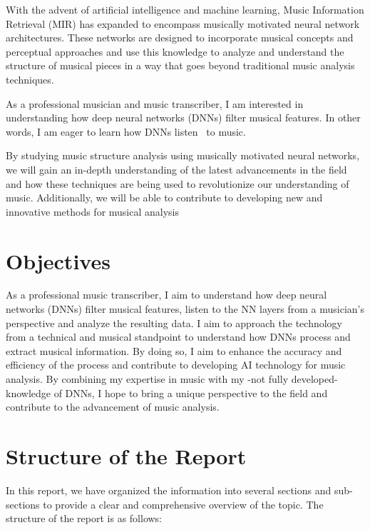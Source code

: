 With the advent of artificial intelligence and machine learning, Music Information Retrieval (MIR) has expanded to encompass musically motivated neural network architectures. These networks are designed to incorporate musical concepts and perceptual approaches and use this knowledge to analyze and understand the structure of musical pieces in a way that goes beyond traditional music analysis techniques.

As a professional musician and music transcriber, I am interested in understanding how deep neural networks (DNNs) filter musical features. In other words, I am eager to learn how DNNs listen~\cite{7500246} to music.

By studying music structure analysis using musically motivated neural networks, we will gain an in-depth understanding of the latest advancements in the field and how these techniques are being used to revolutionize our understanding of music. Additionally, we will be able to contribute to developing new and innovative methods for musical analysis~\cite{Huang2019MusicTG}

\section{Objectives}

As a professional music transcriber, I aim to understand how deep neural networks (DNNs) filter musical features, listen to the NN layers from a musician's perspective and analyze the resulting data. I aim to approach the technology from a technical and musical standpoint to understand how DNNs process and extract musical information. By doing so, I aim to enhance the accuracy and efficiency of the process and contribute to developing AI technology for music analysis. By combining my expertise in music with my -not fully developed- knowledge of DNNs, I hope to bring a unique perspective to the field and contribute to the advancement of music analysis.

\section{Structure of the Report}

In this report, we have organized the information into several sections and sub-sections to provide a clear and comprehensive overview of the topic. The structure of the report is as follows:

